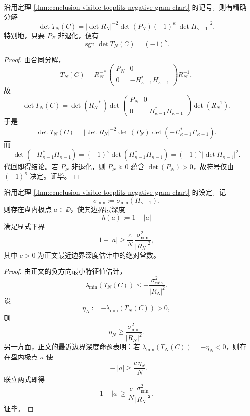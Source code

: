 \begin{theorem}\label{thm:conclusion-visible-toeplitz-determinant-signed-hankel-split}
沿用定理 \ref{thm:conclusion-visible-toeplitz-negative-gram-chart} 的记号，则有精确分解
\[
\det T_N(C)
=
|\det R_N|^{-2}\det(P_N)(-1)^{\kappa}|\det H_{\kappa-1}|^2.
\]
特别地，只要 \(P_N\) 非退化，便有
\[
\operatorname{sgn}\det T_N(C)=(-1)^{\kappa}.
\]
\end{theorem}
\begin{proof}
由合同分解，
\[
T_N(C)=R_N^{-*}
\begin{pmatrix}
P_N & 0\\
0 & -H_{\kappa-1}^{*}H_{\kappa-1}
\end{pmatrix}
R_N^{-1},
\]
故
\[
\det T_N(C)
=
\det(R_N^{-*})
\det\!\begin{pmatrix}
P_N & 0\\
0 & -H_{\kappa-1}^{*}H_{\kappa-1}
\end{pmatrix}
\det(R_N^{-1}).
\]
于是
\[
\det T_N(C)
=
|\det R_N|^{-2}\det(P_N)\det(-H_{\kappa-1}^{*}H_{\kappa-1}).
\]
而
\[
\det(-H_{\kappa-1}^{*}H_{\kappa-1})
=
(-1)^\kappa \det(H_{\kappa-1}^{*}H_{\kappa-1})
=
(-1)^\kappa |\det H_{\kappa-1}|^2.
\]
代回即得结论。若 \(P_N\) 非退化，则 \(P_N\succeq 0\) 蕴含 \(\det(P_N)>0\)，故符号仅由 \((-1)^\kappa\) 决定。证毕。
\end{proof}

\begin{theorem}\label{thm:conclusion-visible-hankel-singular-value-depth-lower-bound}
沿用定理 \ref{thm:conclusion-visible-toeplitz-negative-gram-chart} 的设定，记
\[
\sigma_{\min}:=\sigma_{\min}(H_{\kappa-1}).
\]
则存在盘内极点 \(a\in\DD\)，使其边界层深度
\[
h(a):=1-|a|
\]
满足显式下界
\[
1-|a|
\ge
\frac{c}{N}\,\frac{\sigma_{\min}^2}{|R_N|^2},
\]
其中 \(c>0\) 为正文最近边界深度估计中的绝对常数。
\end{theorem}
\begin{proof}
由正文的负方向最小特征值估计，
\[
\lambda_{\min}(T_N(C))
\le
-\frac{\sigma_{\min}^2}{|R_N|^2}.
\]
设
\[
\eta_N:=-\lambda_{\min}(T_N(C))>0,
\]
则
\[
\eta_N\ge \frac{\sigma_{\min}^2}{|R_N|^2}.
\]
另一方面，正文的最近边界深度命题表明：若 \(\lambda_{\min}(T_N(C))=-\eta_N<0\)，则存在盘内极点 \(a\) 使
\[
1-|a|\ge \frac{c\,\eta_N}{N}.
\]
联立两式即得
\[
1-|a|
\ge
\frac{c}{N}\frac{\sigma_{\min}^2}{|R_N|^2}.
\]
证毕。
\end{proof}

